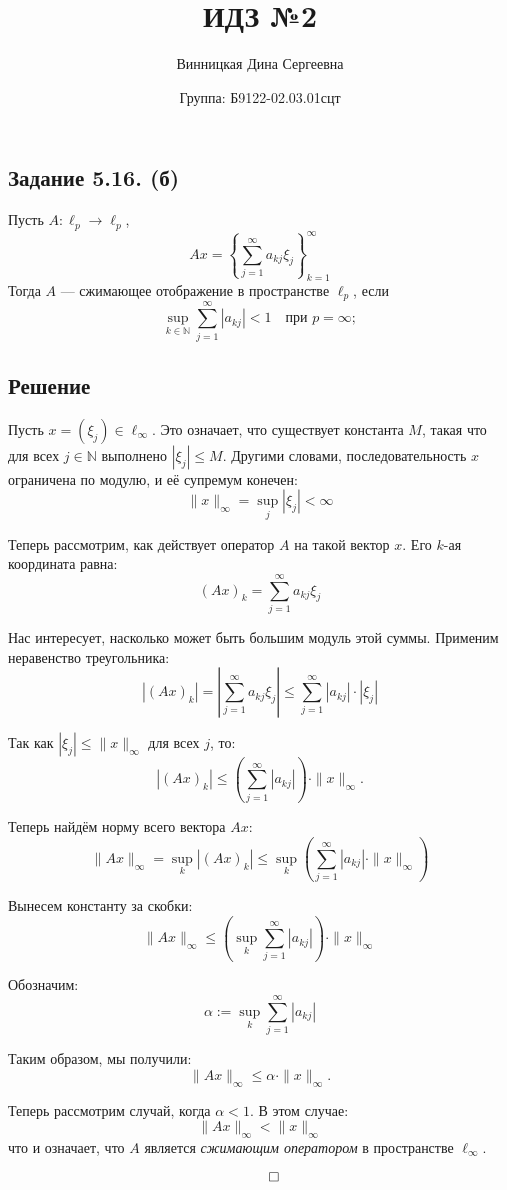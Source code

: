\documentclass{article}
\title{\textbf{ИДЗ №2}}
\author{Винницкая Дина Сергеевна}
\date{Группа: Б9122-02.03.01сцт}
\begin{document}
	
	\maketitle

\subsection{Задание 5.16. (б)}
 Пусть $A: \ell_p \to \ell_p$, 
\[
Ax = \left\{ \sum_{j=1}^{\infty} a_{kj} \xi_j \right\}_{k=1}^{\infty}
\]
Тогда $A$ — сжимающее отображение в пространстве $\ell_p$, если
    \[
    \sup_{k \in \mathbb{N}} \sum_{j=1}^{\infty} |a_{kj}| < 1 \quad \text{при } p = \infty;
    \]

\subsection{Решение}

Пусть $x = (\xi_j) \in \ell_\infty$. Это означает, что существует константа $M$, такая что для всех $j \in \mathbb{N}$ выполнено $|\xi_j| \leq M$. Другими словами, последовательность $x$ ограничена по модулю, и её супремум конечен:
\[
\|x\|_\infty = \sup_j |\xi_j| < \infty
\]

Теперь рассмотрим, как действует оператор $A$ на такой вектор $x$. Его $k$-ая координата равна:
\[
(Ax)_k = \sum_{j=1}^\infty a_{kj} \xi_j
\]

Нас интересует, насколько может быть большим модуль этой суммы. Применим неравенство треугольника:
\[
|(Ax)_k| = \left| \sum_{j=1}^\infty a_{kj} \xi_j \right| \leq \sum_{j=1}^\infty |a_{kj}| \cdot |\xi_j|
\]

Так как $|\xi_j| \leq \|x\|_\infty$ для всех $j$, то:
\[
|(Ax)_k| \leq \left( \sum_{j=1}^\infty |a_{kj}| \right) \cdot \|x\|_\infty.
\]

Теперь найдём норму всего вектора $Ax$:
\[
\|Ax\|_\infty = \sup_k |(Ax)_k| \leq \sup_k \left( \sum_{j=1}^\infty |a_{kj}| \cdot \|x\|_\infty \right)
\]

Вынесем константу за скобки:
\[
\|Ax\|_\infty \leq \left( \sup_k \sum_{j=1}^\infty |a_{kj}| \right) \cdot \|x\|_\infty
\]

Обозначим:
\[
\alpha := \sup_k \sum_{j=1}^\infty |a_{kj}|
\]

Таким образом, мы получили:
\[
\|Ax\|_\infty \leq \alpha \cdot \|x\|_\infty.
\]

Теперь рассмотрим случай, когда $\alpha < 1$. В этом случае:
\[
\|Ax\|_\infty < \|x\|_\infty
\]
что и означает, что $A$ является \textit{сжимающим оператором} в пространстве $\ell_\infty$.

$$\qed$$
\end{document}
